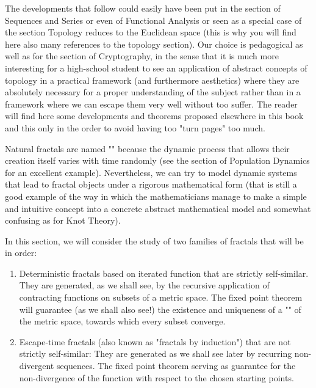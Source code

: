 	\begin{tcolorbox}[title=Remark,colframe=black,arc=10pt]
	The developments that follow could easily have been put in the section of Sequences and Series or even of Functional Analysis or seen as a special case of the section Topology reduces to the Euclidean space (this is why you will find here also many references to the topology section). Our choice is pedagogical as well as for the section of Cryptography, in the sense that it is much more interesting for a high-school student to see an application of abstract concepts of topology in a practical framework (and furthermore aesthetics) where they are absolutely necessary for a proper understanding of the subject rather than in a framework where we can escape them very well without too suffer. The reader will find here some developments and theorems proposed elsewhere in this book and this only in the order to avoid having too "turn pages" too much.
	\end{tcolorbox}	
	
	Natural fractals are named "" because the dynamic process that allows their creation itself varies with time randomly (see the section of Population Dynamics for an excellent example). Nevertheless, we can try to model dynamic systems that lead to fractal objects under a rigorous mathematical form (that is still a good example of the way in which the mathematicians manage to make a simple and intuitive concept into a concrete abstract mathematical model and somewhat confusing as for Knot Theory).
	
	In this section, we will consider the study of two families of fractals that will be in order:
	\begin{enumerate}
		\item Deterministic fractals based on iterated function that are strictly self-similar. They are generated, as we shall see, by the recursive application of contracting functions on subsets of a metric space. The fixed point theorem will guarantee (as we shall also see!) the existence and uniqueness of a "" of the metric space, towards which every subset converge.
		
		\item Escape-time fractals (also known as "fractals by induction") that are not strictly self-similar: They are generated as we shall see later by recurring non-divergent sequences. The fixed point theorem serving as guarantee for the non-divergence of the function with respect to the chosen starting points.
	\end{enumerate}
	
